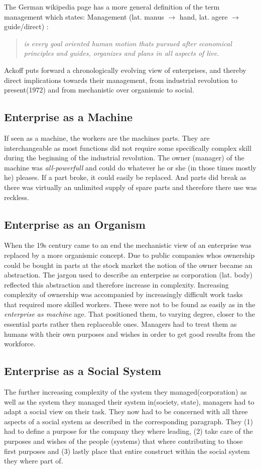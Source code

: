 \documentclass{scrartcl}
\begin{document}
The German wikipedia page has a more general definition of the term management which states: Management (lat. manus $\rightarrow$ hand, lat. agere $\rightarrow$ guide/direct) :
\begin{quote}\itshape{ \glqq is every goal oriented human motion thats pursued after economical principles and guides, organizes and plans in all aspects of live. \grqq
} \cite{ackoff1994systems} 
\end{quote}

Ackoff puts forward a chronologically evolving view of enterprises, and thereby direct implications towards their management, from industrial revolution to present(1972) and from mechanistic over organismic to social.

\subsection {Enterprise as a Machine}
If seen as a machine, the workers are the machines parts. They are interchangeable as most functions did not require some specifically complex skill during the beginning of the industrial revolution. The owner (manager) of the machine was \textit{ \glqq all-powerfull\grqq}  and could do whatever he or she (in those times mostly he) pleases. If a part broke, it could easily be replaced. And parts did break as there was virtually an unlimited supply of spare parts and therefore there use was reckless.

\subsection{Enterprise as an Organism}
When the 19s century came to an end the mechanistic view of an enterprise was replaced by a more organismic concept. Due to public companies whos ownership could be bought in parts at the stock market the notion of the owner became an abstraction. The jargon used to describe an enterprise as corporation (lat. body) reflected this abstraction and therefore increase in complexity. Increasing complexity of ownership was accompanied by increasingly difficult work tasks that required more skilled workers. These were not to be found as easily as in the \textit{\glqq enterprise as machine\grqq} age. That positioned them, to varying degree, closer to the essential parts rather then replaceable ones.
Managers had to treat them as humans with their own purposes and wishes in order to get good results from the workforce.

\subsection{Enterprise as a Social System}
The further increasing complexity of the system they managed(corporation) as well as the system they managed their system in(society, state), managers had to adapt a social view on their task. They now had to be concerned with all three aspects of a social system as described in the corresponding paragraph. They (1) had to define a purpose for the company they where leading, (2) take care of the purposes and wishes of the people (systems) that where contributing to those first purposes and (3) lastly place that entire construct within the social system they where part of.
\end{document}
